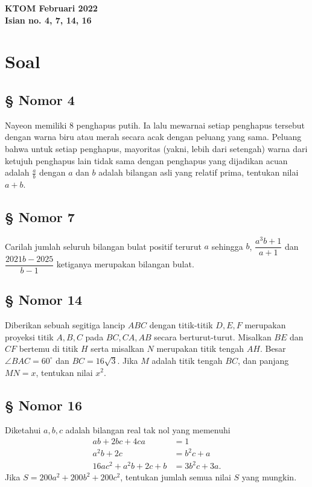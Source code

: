 \begin{center}
    \textbf{\Huge \textcolor{Red!80}{K}\textcolor{Green!80}{T}\textcolor{Blue!70}{O}\textcolor{YellowOrange!80}{M} Februari 2022}\\
    \textbf{\large Isian no. 4, 7, 14, 16}
\end{center}




\section{Soal}
\subsection*{\protect\textcolor{EvanRed}{\S} Nomor 4} Nayeon memiliki 8 penghapus putih. Ia lalu mewarnai setiap penghapus tersebut dengan warna biru atau merah secara acak dengan peluang yang sama. Peluang bahwa untuk setiap penghapus, mayoritas (yakni, lebih dari setengah) warna dari ketujuh penghapus lain tidak sama dengan penghapus yang dijadikan acuan adalah $\frac{a}{b}$ dengan $a$ dan $b$ adalah bilangan asli yang relatif prima, tentukan nilai $a+b$.

\subsection*{\protect\textcolor{EvanRed}{\S} Nomor 7} Carilah jumlah seluruh bilangan bulat positif terurut $a$ sehingga $b$, $\dfrac{a^3b+1}{a+1}$ dan $\dfrac{2021b-2025}{b-1}$ ketiganya merupakan bilangan bulat.

\subsection*{\protect\textcolor{EvanRed}{\S} Nomor 14} Diberikan sebuah segitiga lancip $ABC$ dengan titik-titik $D,E,F$ merupakan proyeksi titik $A,B,C$ pada $BC,CA,AB$ secara berturut-turut. Misalkan $BE$ dan $CF$ bertemu di titik $H$ serta misalkan $N$ merupakan titik tengah $AH$. Besar$\angle BAC = 60^\circ$ dan $BC=16\sqrt{3}$. Jika $M$ adalah titik tengah $BC$, dan panjang $MN = x$, tentukan nilai $x^2$.


\subsection*{\protect\textcolor{EvanRed}{\S} Nomor 16} Diketahui $a,b,c$ adalah bilangan real tak nol yang memenuhi 
\begin{align*}
    ab+2bc+4ca&=1\\
    a^2b+2c&=b^2c+a\\
    16ac^2+a^2b+2c+b &= 3b^2c+3a.
\end{align*}
Jika $S=200a^2+200b^2+200c^2$, tentukan jumlah semua nilai $S$ yang mungkin.

